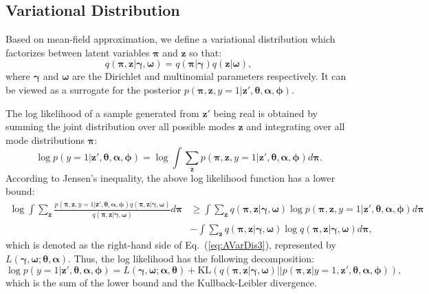 \documentclass{article}
\begin{document}
\subsection{Variational Distribution}
\label{App:VaDistribution}

Based on mean-field approximation, we define a variational distribution which factorizes between latent variables $\bm{\pi}$ and $\bm{z}$ so that:
\begin{equation}
\label{eq:AVarDis1}
q\left( \bm{\pi}, \mathbf{z}|\bm{\gamma},\bm{\omega} \right)
=
q\left( \bm{\pi} | \bm{\gamma} \right)
q\left( \mathbf{z} | \bm{\omega} \right),
\end{equation}
where $\bm{\gamma}$ and $\bm{\omega}$ are the Dirichlet and multinomial parameters respectively.
It can be viewed as a surrogate for the posterior $p\left(\bm{\pi}, \mathbf{z}, y=1|\mathbf{z}',\bm{\theta}, \bm{\alpha},\bm{\phi}\right)$.


The log likelihood of a sample generated from $\mathbf{z}'$ being real is obtained by summing the joint distribution over all possible modes $\mathbf{z}$ and integrating over all mode distributions $\bm{\pi}$:
\begin{equation}
\label{eq:AVarDis2}
\log p\left( y=1 | \mathbf{z}',\bm{\theta},\bm{\alpha}, \bm{\phi} \right)
=
\log
\int
\sum_{\mathbf{z}}
p\left( \bm{\pi},\mathbf{z},y=1 | \mathbf{z}',\bm{\theta},\bm{\alpha},\bm{\phi} \right)
d\bm{\pi}.
\end{equation}
\noindent According to Jensen's inequality, the above log likelihood function has a lower bound:
\begin{align}
\label{eq:AVarDis3}
\log
\int
\sum_{\mathbf{z}}
\frac{p\left( \bm{\pi},\mathbf{z},y=1 | \mathbf{z}',\bm{\theta},\bm{\alpha},\bm{\phi} \right)
q\left( \bm{\pi},\mathbf{z} | \bm{\gamma},\bm{\omega} \right)}
{q\left( \bm{\pi}, \mathbf{z} | \bm{\gamma},\bm{\omega} \right)}
d\bm{\pi}
&\geq  \nonumber
\int
\sum_{\mathbf{z}}
q\left( \bm{\pi}, \mathbf{z}|\bm{\gamma},\bm{\omega} \right)
\log p\left( \bm{\pi},\mathbf{z},y=1 | \mathbf{z}',\bm{\theta},\bm{\alpha},\bm{\phi} \right)
d\bm{\pi}  \\
&-\int
\sum_{\mathbf{z}}
q\left( \bm{\pi},\mathbf{z} | \bm{\gamma},\bm{\omega} \right)
\log q\left( \bm{\pi},\mathbf{z} | \bm{\gamma},\bm{\omega} \right)
d\bm{\pi},
\end{align}
which is denoted as the right-hand side of Eq.~(\ref{eq:AVarDis3}), represented by $L\left(\bm{\gamma},\bm{\omega};\bm{\theta},\bm{\alpha}\right)$.
Thus, the log likelihood has the following decomposition:
\begin{equation}
\label{eq:AVarDis4}
\log p\left(y=1|\mathbf{z}',\bm{\theta},\bm{\alpha}, \bm{\phi}\right)
=
L\left( \bm{\gamma},\bm{\omega};\bm{\alpha},\bm{\theta} \right)
+ \text{KL}\left( q\left( \bm{\pi},\mathbf{z} | \bm{\gamma},\bm{\omega} \right)
|| p\left( \bm{\pi}, \mathbf{z} |y=1, \mathbf{z}',\bm{\theta},\bm{\alpha},\bm{\phi} \right) \right),
\end{equation}
which is the sum of the lower bound and the Kullback-Leibler divergence.
\end{document}

